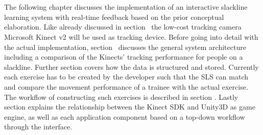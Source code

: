 \chapter{}\label{5_systemIntegration}
The following chapter discusses the implementation of an interactive slackline learning system with real-time feedback based on the prior conceptual elaboration.
Like already discussed in section~\textit{} the low-cost tracking camera Microsoft Kinect v2 will be used as tracking device.
Before going into detail with the actual implementation, section~\textit{} discusses the general system architecture including a comparison of the Kinects' tracking performance for people on a slackline.
Further section \textit{} covers how the data is structured and stored.
Currently each exercise has to be created by the developer such that the SLS can match and compare the movement performance of a trainee with the actual exercise. 
The workflow of constructing such exercises is described in section \textit{}.
Lastly section \textit{} explains the relationship between the Kinect SDK and Unity3D as game engine, as well as each application component based on a top-down workflow through the interface.








